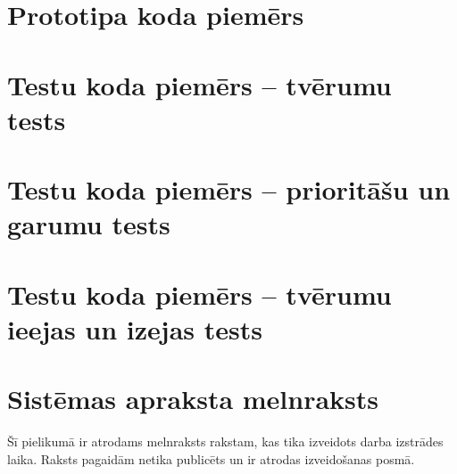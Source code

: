 \documentclass[12pt, a4paper]{article}
\begin{document}

%

\appendixtitleon
\appendixtitletocon

\begin{appendices}

\newcommand{\ap}[1]{\section{#1}}
\renewcommand\thesection{\arabic{section} }

\ap{Prototipa koda piemērs}
\label{ap:code_sample}



\ap{Testu koda piemērs -- tvērumu tests}
\label{ap:test1_sample}



\ap{Testu koda piemērs -- prioritāšu un garumu tests}
\label{ap:test2_sample}



\ap{Testu koda piemērs -- tvērumu ieejas un izejas tests}
\label{ap:test3_sample}



\ap{Sistēmas apraksta melnraksts}
\label{ap:draft}

Šī pielikumā ir atrodams melnraksts rakstam, kas tika izveidots darba izstrādes laika. Raksts pagaidām netika publicēts un ir atrodas izveidošanas posmā.



\end{appendices}

{}


\reglapa
\end{document}
